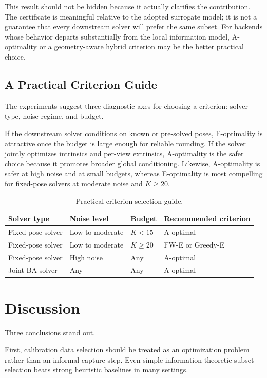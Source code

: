 \documentclass[11pt]{article}
\begin{document}
This result should not be hidden because it actually clarifies the contribution.
The certificate is meaningful relative to the adopted surrogate model; it is
not a guarantee that every downstream solver will prefer the same subset. For
backends whose behavior departs substantially from the local information model,
A-optimality or a geometry-aware hybrid criterion may be the better practical
choice.

\subsection{A Practical Criterion Guide}
The experiments suggest three diagnostic axes for choosing a criterion:
solver type, noise regime, and budget.

If the downstream solver conditions on known or pre-solved poses, E-optimality
is attractive once the budget is large enough for reliable rounding. If the
solver jointly optimizes intrinsics and per-view extrinsics, A-optimality is the
safer choice because it promotes broader global conditioning. Likewise,
A-optimality is safer at high noise and at small budgets, whereas E-optimality
is most compelling for fixed-pose solvers at moderate noise and
$K \ge 20$.

\begin{table}[ht]
\centering
\small
\caption{Practical criterion selection guide.}
\label{tab:criterion_guide}
\setlength{\tabcolsep}{5pt}
\begin{tabular}{llll}
\toprule
Solver type & Noise level & Budget & Recommended criterion \\
\midrule
Fixed-pose solver & Low to moderate & $K < 15$ & A-optimal \\
Fixed-pose solver & Low to moderate & $K \ge 20$ & FW-E or Greedy-E \\
Fixed-pose solver & High noise & Any & A-optimal \\
Joint BA solver & Any & Any & A-optimal \\
\bottomrule
\end{tabular}
\end{table}

\section{Discussion}
Three conclusions stand out.

First, calibration data selection should be treated as an optimization problem
rather than an informal capture step. Even simple information-theoretic subset
selection beats strong heuristic baselines in many settings.
\end{document}
